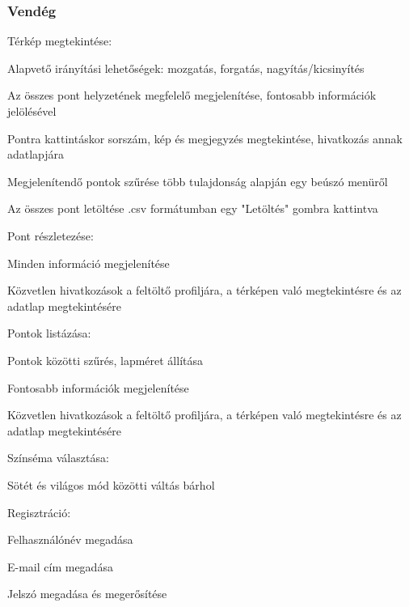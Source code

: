 \subsubsection{Vendég}
\begin{compactitem}
	\item Térkép megtekintése:
		\begin{compactitem}
			\item Alapvető irányítási lehetőségek: mozgatás, forgatás, nagyítás/kicsinyítés
			\item Az összes pont helyzetének megfelelő megjelenítése, fontosabb információk jelölésével
			\item Pontra kattintáskor sorszám, kép és megjegyzés megtekintése, hivatkozás annak adatlapjára
			\item Megjelenítendő pontok szűrése több tulajdonság alapján egy beúszó menüről
			\item Az összes pont letöltése .csv formátumban egy "Letöltés" gombra kattintva
		\end{compactitem}
	\item Pont részletezése:
		\begin{compactitem}
			\item Minden információ megjelenítése
			\item Közvetlen hivatkozások a feltöltő profiljára, a térképen való megtekintésre és az adatlap megtekintésére
		\end{compactitem}
	\item Pontok listázása:
		\begin{compactitem}
			\item Pontok közötti szűrés, lapméret állítása
			\item Fontosabb információk megjelenítése
			\item Közvetlen hivatkozások a feltöltő profiljára, a térképen való megtekintésre és az adatlap megtekintésére
		\end{compactitem}
	\item Színséma választása:
		\begin{compactitem}
			\item Sötét és világos mód közötti váltás bárhol 
		\end{compactitem}
	\item Regisztráció:
	\begin{compactitem}
		\item Felhasználónév megadása
		\item E-mail cím megadása
		\item Jelszó megadása és megerősítése

\end{compactitem}
\end{compactitem}
